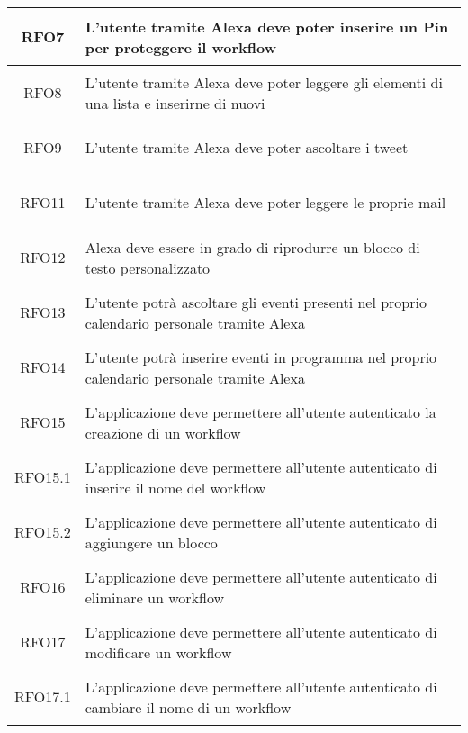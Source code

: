 \begin{longtable}{|c|X|}
	\hypertarget{RFO7}{RFO7} & L'utente tramite Alexa deve poter inserire un Pin per proteggere il workflow \\ \hline
	
	\hypertarget{RFO8}{RFO8} & L'utente tramite Alexa deve poter leggere gli elementi di una lista e inserirne di nuovi \\ \hline
	
	\hypertarget{RFO9}{RFO9} & L'utente tramite Alexa deve poter ascoltare i tweet \\ \hline
	
	\hypertarget{RFO11}{RFO11} & L'utente tramite Alexa deve poter leggere le proprie mail \\ \hline
	
	\hypertarget{RFO12}{RFO12} & Alexa deve essere in grado di riprodurre un blocco di testo personalizzato\\ \hline
	
	\hypertarget{RFO13}{RFO13} & L'utente potrà ascoltare gli eventi presenti nel proprio calendario personale tramite Alexa\\ \hline
	
	\hypertarget{RFO14}{RFO14} & L'utente potrà inserire eventi in programma nel proprio calendario personale tramite Alexa\\ \hline
	
	\hypertarget{RFO15}{RFO15} & L'applicazione deve permettere all'utente autenticato la creazione di un workflow\\ \hline
	
	\hypertarget{RFO15.1}{RFO15.1} & L'applicazione deve permettere all'utente autenticato di inserire il nome del workflow\\ \hline
	
	\hypertarget{RFO15.2}{RFO15.2} & L'applicazione deve permettere all'utente autenticato di aggiungere un blocco\\ \hline
	
	\hypertarget{RFO16}{RFO16} & L'applicazione deve permettere all'utente autenticato di eliminare un workflow\\ \hline
	
	\hypertarget{RFO17}{RFO17} & L'applicazione deve permettere all'utente autenticato di modificare un workflow \\ \hline
	
	\hypertarget{RFO17.1}{RFO17.1} & L'applicazione deve permettere all'utente autenticato di cambiare il nome di un workflow \\ \hline
	

\end{longtable}
